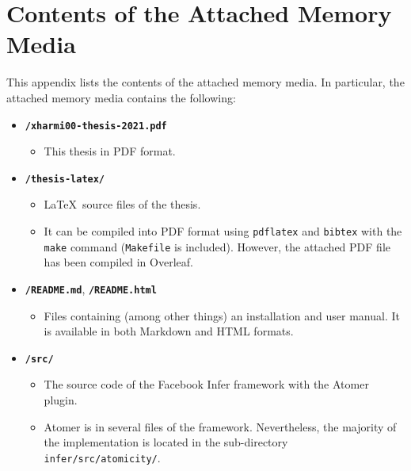 




\chapter{Contents of the Attached Memory Media}
\label{app:memMedia}

This appendix lists the contents of the attached memory media. In particular, the attached memory media contains the following:
\begin{itemize}
    \item \texttt{\textbf{/xharmi00-thesis-2021.pdf}}
        \begin{itemize}
            \item This thesis in PDF format.
        \end{itemize}

    \item \texttt{\textbf{/thesis-latex/}}
        \begin{itemize}
            \item \LaTeX\ source files of the thesis.
            
            \item It can be compiled into PDF format using \texttt{pdflatex} and \texttt{bibtex} with the \texttt{make} command (\texttt{Makefile} is included). However, the attached PDF file has been compiled in Overleaf.
        \end{itemize}

    \item \texttt{\textbf{/README.md}}, \texttt{\textbf{/README.html}}
        \begin{itemize}
            \item Files containing (among other things) an installation and user manual. It is available in both Markdown and HTML formats.
        \end{itemize}
    
    \item \texttt{\textbf{/src/}}
        \begin{itemize}
            \item The source code of the Facebook Infer framework with the Atomer plugin.
            
            \item Atomer is  in several files of the framework. Nevertheless, the majority of the implementation is located in the sub-directory \texttt{infer/src/atomicity/}.
        \end{itemize}
    

\end{itemize}
